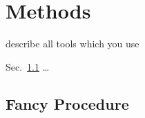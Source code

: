 
\chapter{Methods}
\label{ch:methods}

describe all tools which you use

Sec.~\ref{sec:fancy_procedure} \ldots


\section{Fancy Procedure}
\label{sec:fancy_procedure}


